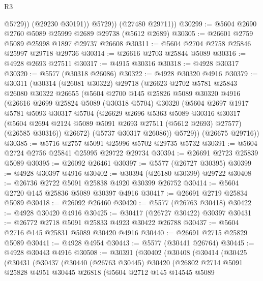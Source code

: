 \begin{lexlean}{R3}
\begin{coremodule}
                @5729))
            (@29230 @30191))
          @5729))
      (@27480 @29711))
@30299 := @5604 @2690 @2760 @5089 @25999 @2689 @29738 (@5612 @2689)
@30305 := @26601 @2759 @5089 @25998 @1897 @29737 @26608
@30311 := @5604 @2704 @2758 @25846 @25997 @29718 @29736
@30314 := @26616 @2703 @25844 @5089
@30316 := @4928 @2693 @27511
@30317 := @4915 @30316
@30318 := @4928 @30317
@30320 := @5577 (@30318 @26086)
@30322 := @4928 @30320 @4916
@30379 := @30311
    (@30314
      (@26081 @30322)
      @29718
      (@26623
        @2702
        @5781
        @25843
        @26080
        @30322
        @26655
        (@5604
          @2700
          @145
          @25826
          @5089
          @30320
          @4916
          (@26616
            @2699
            @25824
            @5089
            (@30318 @5704)
            @30320
            (@5604
              @2697
              @1917
              @5781
              @5093
              @30317
              @5704
              (@26629
                @2696
                @5363
                @5089
                @30316
                @30317
                (@5604 @2694 @2124 @5089 @5091 @2693 @27511 (@5612 @2693) @27577)
                (@26585 @30316))
              @26672)
            (@5737 @30317 @26086))
          @5729))
      (@26675 @29716))
@30385 := @5716 @2757 @5091 @25996 @5702 @29735 @5732
@30391 := @5604 @2724 @2756 @25841 @25995 @29722 @29734
@30394 := @26691 @2723 @25839 @5089
@30395 := @26092 @26461
@30397 := @5577 (@26727 @30395)
@30399 := @4928 @30397 @4916
@30402 := @30394 (@26180 @30399) @29722
@30408 := @26736 @2722 @5091 @25838 @4920 @30399 @26752
@30414 := @5604 @2720 @145 @25836 @5089 @30397 @4916
@30417 := @26691 @2719 @25834 @5089
@30418 := @26092 @26460
@30420 := @5577 (@26763 @30418)
@30422 := @4928 @30420 @4916
@30425 := @30417 (@26727 @30422) @30397
@30431 := @26772 @2718 @5091 @25833 @4923 @30422 @26788
@30437 := @5604 @2716 @145 @25831 @5089 @30420 @4916
@30440 := @26691 @2715 @25829 @5089
@30441 := @4928 @4954
@30443 := @5577 (@30441 @26764)
@30445 := @4928 @30443 @4916
@30508 := @30391
    (@30402
      (@30408
        (@30414
          (@30425
            (@30431
              (@30437
                (@30440
                  (@26763 @30445)
                  @30420
                  (@26802
                    @2714
                    @5091
                    @25828
                    @4951
                    @30445
                    @26818
                    (@5604
                      @2712
                      @145
                      @14545
                      @5089

\end{coremodule}
\end{lexlean}
